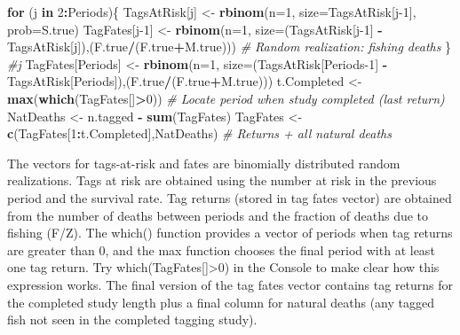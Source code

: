 \documentclass[
]{krantz}
\makeatletter
\newenvironment{Shaded}{\begin{snugshade}}{\end{snugshade}}
\newcommand{\AttributeTok}[1]{\textcolor[rgb]{0.27,0.27,0.27}{#1}}
\newcommand{\CommentTok}[1]{\textcolor[rgb]{0.37,0.37,0.37}{\textit{#1}}}
\newcommand{\ControlFlowTok}[1]{\textcolor[rgb]{0.27,0.27,0.27}{\textbf{#1}}}
\newcommand{\DecValTok}[1]{\textcolor[rgb]{0.06,0.06,0.06}{#1}}
\newcommand{\FunctionTok}[1]{\textcolor[rgb]{0.27,0.27,0.27}{\textbf{#1}}}
\newcommand{\NormalTok}[1]{#1}
\newcommand{\OtherTok}[1]{\textcolor[rgb]{0.37,0.37,0.37}{#1}}
\newcommand{\SpecialCharTok}[1]{\textcolor[rgb]{0.43,0.43,0.43}{\textbf{#1}}}
\newenvironment{kframe}{%
\medskip{}
\setlength{\fboxsep}{.8em}
 \def\at@end@of@kframe{}%
 \ifinner\ifhmode%
  \def\at@end@of@kframe{\end{minipage}}%
  \begin{minipage}{\columnwidth}%
 \fi\fi%
 \def\FrameCommand##1{\hskip\@totalleftmargin \hskip-\fboxsep
 \colorbox{shadecolor}{##1}\hskip-\fboxsep
     \hskip-\linewidth \hskip-\@totalleftmargin \hskip\columnwidth}%
 \MakeFramed {\advance\hsize-\width
   \@totalleftmargin\z@ \linewidth\hsize
   \@setminipage}}%
 {\par\unskip\endMakeFramed%
 \at@end@of@kframe}
\renewenvironment{Shaded}{\begin{kframe}}{\end{kframe}}
\makeatother
\begin{document}
\begin{Shaded}
\begin{Highlighting}[]
\ControlFlowTok{for}\NormalTok{ (j }\ControlFlowTok{in} \DecValTok{2}\SpecialCharTok{:}\NormalTok{Periods)\{}
\NormalTok{  TagsAtRisk[j] }\OtherTok{\textless{}{-}} \FunctionTok{rbinom}\NormalTok{(}\AttributeTok{n=}\DecValTok{1}\NormalTok{, }\AttributeTok{size=}\NormalTok{TagsAtRisk[j}\DecValTok{{-}1}\NormalTok{], }\AttributeTok{prob=}\NormalTok{S.true)}
\NormalTok{  TagFates[j}\DecValTok{{-}1}\NormalTok{] }\OtherTok{\textless{}{-}} \FunctionTok{rbinom}\NormalTok{(}\AttributeTok{n=}\DecValTok{1}\NormalTok{, }\AttributeTok{size=}\NormalTok{(TagsAtRisk[j}\DecValTok{{-}1}\NormalTok{]}
                        \SpecialCharTok{{-}}\NormalTok{TagsAtRisk[j]),(F.true}\SpecialCharTok{/}\NormalTok{(F.true}\SpecialCharTok{+}\NormalTok{M.true))) }\CommentTok{\# Random realization: fishing deaths}
\NormalTok{  \} }\CommentTok{\#j}
\NormalTok{TagFates[Periods] }\OtherTok{\textless{}{-}} \FunctionTok{rbinom}\NormalTok{(}\AttributeTok{n=}\DecValTok{1}\NormalTok{, }\AttributeTok{size=}\NormalTok{(TagsAtRisk[Periods}\DecValTok{{-}1}\NormalTok{]}
                        \SpecialCharTok{{-}}\NormalTok{TagsAtRisk[Periods]),(F.true}\SpecialCharTok{/}\NormalTok{(F.true}\SpecialCharTok{+}\NormalTok{M.true)))}
\NormalTok{t.Completed }\OtherTok{\textless{}{-}} \FunctionTok{max}\NormalTok{(}\FunctionTok{which}\NormalTok{(TagFates[]}\SpecialCharTok{\textgreater{}}\DecValTok{0}\NormalTok{)) }\CommentTok{\# Locate period when study completed (last return)}
\NormalTok{NatDeaths }\OtherTok{\textless{}{-}}\NormalTok{ n.tagged }\SpecialCharTok{{-}} \FunctionTok{sum}\NormalTok{(TagFates)}
\NormalTok{TagFates }\OtherTok{\textless{}{-}} \FunctionTok{c}\NormalTok{(TagFates[}\DecValTok{1}\SpecialCharTok{:}\NormalTok{t.Completed],NatDeaths) }\CommentTok{\# Returns + all natural deaths}
\end{Highlighting}
\end{Shaded}

The vectors for tags-at-risk and fates are binomially distributed random realizations. Tags at risk are obtained using the number at risk in the previous period and the survival rate. Tag returns (stored in tag fates vector) are obtained from the number of deaths between periods and the fraction of deaths due to fishing (F/Z). The which() function provides a vector of periods when tag returns are greater than 0, and the max function chooses the final period with at least one tag return. Try which(TagFates{[}{]}\textgreater0) in the Console to make clear how this expression works. The final version of the tag fates vector contains tag returns for the completed study length plus a final column for natural deaths (any tagged fish not seen in the completed tagging study).
\end{document}
